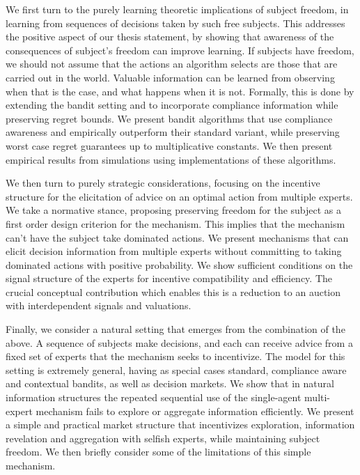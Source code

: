 We first turn to the purely learning theoretic implications of subject freedom, in learning from sequences of decisions taken by such free subjects.
This addresses the positive aspect of our thesis statement, by showing that awareness of the consequences of subject's freedom can improve learning.
If subjects have freedom, we should not assume that the actions an algorithm selects are those that are carried out in the world.
Valuable information can be learned from observing when that is the case, and what happens when it is not.
Formally, this is done by extending the bandit setting and to incorporate compliance information while preserving regret bounds. 
We present bandit algorithms that use compliance awareness and empirically outperform their standard variant, while preserving worst case regret guarantees up to multiplicative constants.
We then present empirical results from simulations using implementations of these algorithms.

We then turn to purely strategic considerations, focusing on the incentive structure for the elicitation of advice on an optimal action from multiple experts.
We take a normative stance, proposing preserving freedom for the subject as a first order design criterion for the mechanism. This implies that the mechanism can't have the subject take dominated actions.
We present mechanisms that can elicit decision information from multiple experts without committing to taking dominated actions with positive probability. We show sufficient conditions on the signal structure of the experts for incentive compatibility and efficiency.
The crucial conceptual contribution which enables this is a reduction to an auction with interdependent signals and valuations. 


Finally, we consider a natural setting that emerges from the combination of the above. A sequence of subjects make decisions, and each can receive advice from a fixed set of experts that the mechanism seeks to incentivize.
The model for this setting is extremely general, having as special cases standard, compliance aware and contextual bandits, as well as decision markets.
We show that in natural information structures the repeated sequential use of the single-agent multi-expert mechanism fails to explore or aggregate information efficiently.
We present a simple and practical market structure that incentivizes exploration, information revelation and aggregation with selfish experts, while maintaining subject freedom. We then briefly consider some of the limitations of this simple mechanism.


